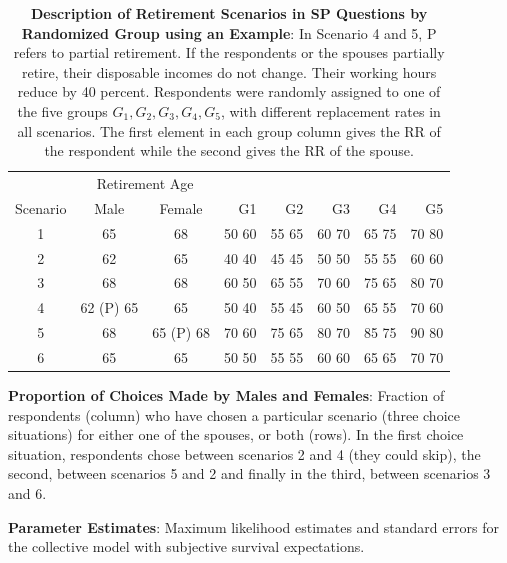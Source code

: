 \documentclass[11pt,letter]{article}
\begin{document}
\begin{table}[!htbp]
\centering
\begin{tabular}{cccrrrrr}
\hline \hline
& \multicolumn{2}{c}{Retirement Age} & & & & & \\
Scenario & Male & Female & G1    & G2    & G3    & G4    & G5 \\
\hline
1 & 65    & 68    & 50 60 & 55 65 & 60 70 & 65 75 & 70 80 \\
2 & 62    & 65    & 40 40 & 45 45 & 50 50 & 55 55 & 60 60 \\
3 & 68    & 68    & 60 50 & 65 55 & 70 60 & 75 65 & 80 70 \\
4 & 62 (P) 65 & 65    & 50 40 & 55 45 & 60 50 & 65 55 & 70 60 \\
5 & 68    & 65 (P) 68 & 70 60 & 75 65 & 80 70 & 85 75 & 90 80 \\
6 & 65    & 65    & 50 50 & 55 55 & 60 60 & 65 65 & 70 70 \\
\hline \hline
\end{tabular}%
\caption{\textbf{Description of Retirement Scenarios in SP Questions by Randomized Group using an Example}: In Scenario 4 and 5, P refers to partial retirement. If the respondents or the spouses partially retire, their disposable incomes do not change. Their working hours reduce by 40 percent. Respondents were randomly assigned to one of the five groups $G_{1},G_{2},G_{3},G_{4},G_{5}$, with different replacement rates in all scenarios. The first element in each group column gives the RR of the respondent while the second gives the RR of the spouse. }
\label{tab:example}
\end{table}

\clearpage


\begin{table}[!htbp]
\centering

\caption{\textbf{Proportion of Choices Made by Males and Females}: Fraction of respondents (column) who have chosen a particular scenario (three choice situations) for either one of the spouses, or both (rows). In the first choice situation, respondents chose between scenarios 2 and 4 (they could skip), the second, between scenarios 5 and 2 and finally in the third, between scenarios 3 and 6.}
\label{tab:choices}
\end{table}


\begin{table}[!htbp]
\centering

\caption{\textbf{Parameter Estimates}: Maximum likelihood estimates and standard errors for the collective model with subjective survival expectations.}
\end{table}
\end{document}
